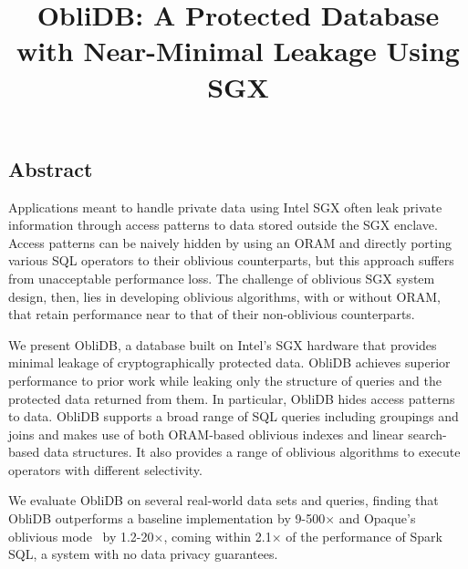 \documentclass[letterpaper,twocolumn,10pt]{article}
\newcommand{\ignore}[1]{}
\def\name/{ObliDB}
\begin{document}
\date{}

\title{\Large \bf \name/: A Protected Database with Near-Minimal Leakage Using SGX}

\ignore{
\author{
{\rm Your N.\ Here}\\
Your Institution
\and
{\rm Second Name}\\
Second Institution
} %
}
\maketitle

\thispagestyle{empty}

 
\subsection*{Abstract}
Applications meant to handle private data using Intel SGX often leak private information through access patterns to data stored outside the SGX enclave. Access patterns can be naively hidden by using an ORAM and directly porting various SQL operators to their oblivious counterparts, but this approach suffers from unacceptable performance loss. The challenge of oblivious SGX system design, then, lies in developing oblivious algorithms, with or without ORAM, that retain performance near to that of their non-oblivious counterparts. 

We present \name/, a database built on Intel's SGX hardware that provides minimal leakage of cryptographically protected data. \name/ achieves superior performance to prior work while leaking only the structure of queries and the protected data returned from them. In particular, \name/ hides access patterns to data. \name/ supports a broad range of SQL queries including groupings and joins and makes use of both ORAM-based oblivious indexes and linear search-based data structures. It also provides a range of oblivious algorithms to execute operators with different selectivity. 

We evaluate \name/ on several real-world data sets and queries, finding that \name/ outperforms a baseline implementation by 9-500$\times$ and Opaque's oblivious mode~\cite{ZDB+17} by 1.2-20$\times$, coming within 2.1$\times$ of the performance of Spark SQL\cite{SparkSQL}, a system with no data privacy guarantees.  
\end{document}
